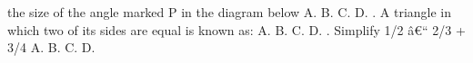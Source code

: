 \documentclass{article}
\begin{document}
\begin{multicols}{2}
the size of the angle marked P in the diagram below \newline \indent A. \newline \indent B. \newline \indent C. \newline \indent D.  \newline{}. A triangle in which two of its sides are equal is known as: \newline \indent A. \newline \indent B. \newline \indent C. \newline \indent D.  \newline{}. Simplify 1/2 â€“ 2/3 + 3/4 \newline \indent A. \newline \indent B. \newline \indent C. \newline \indent D.  \newline \end{multicols} \end{document}
\end{document}
